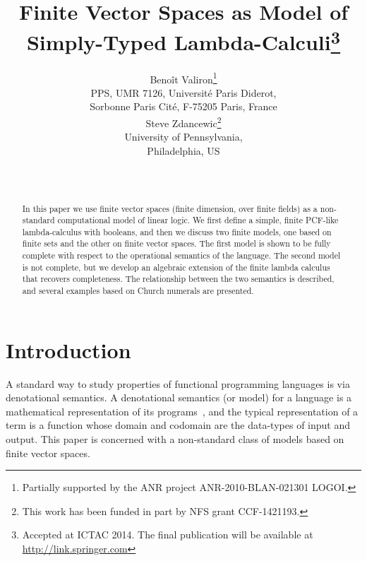 \documentclass[10pt]{article}
\theoremstyle{plain}
\theoremstyle{definition}
\begin{document}
\title{Finite Vector Spaces as Model of Simply-Typed
  Lambda-Calculi\footnote{Accepted at ICTAC 2014. The final
    publication will be available at \url{http://link.springer.com}}}


\author{
  \scriptsize
  \begin{tabular}{c}
    {\large Beno\^it Valiron\footnote{Partially supported by the ANR project ANR-2010-BLAN-021301 LOGOI.}}\\[1.5ex]
    PPS, UMR 7126, Universit\'e Paris Diderot,\\
    Sorbonne Paris Cit\'{e}, F-75205 Paris, France
  \end{tabular}
  \quad
  \begin{tabular}{c}
    {\large Steve Zdancewic\footnote{This work
      has been funded in part by NFS grant CCF-1421193.}}\\[1.5ex]
    University of Pennsylvania,\\
    Philadelphia, US
  \end{tabular}
  \\[-1ex]
  ~}

\maketitle

\begin{abstract}
In this paper we use finite vector spaces (finite dimension, over
finite fields) as a non-standard computational model of linear
logic. We first define a simple, finite PCF-like lambda-calculus with
booleans, and then we discuss two finite models, one based on finite
sets and the other on finite vector spaces. The first model is shown
to be fully complete with respect to the operational semantics of the
language. The second model is not complete, but we develop an
algebraic extension of the finite lambda calculus that recovers
completeness. The relationship between the two semantics is described,
and several examples based on Church numerals are presented.
\end{abstract}


\section{Introduction}

A standard way to study properties of functional programming languages
is via denotational semantics. 
A denotational semantics (or model) for a language is a
mathematical representation of its programs~\cite{winskel-book}, and
the typical representation of a term is a function whose domain and
codomain are the
data-types of input and output.
This paper is concerned with a non-standard class of models
based on finite vector spaces.
\end{document}
